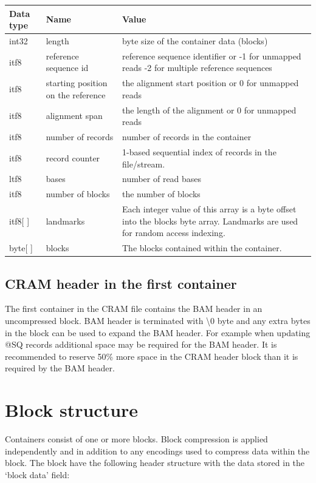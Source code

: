 \documentclass[a4paper]{article}
\begin{document}
\begin{tabular}{|l|>{\raggedright}p{120pt}|>{\raggedright}p{260pt}|}
\hline
\textbf{Data type} & \textbf{Name} & \textbf{Value}
\tabularnewline
\hline
int32 & length & byte size of the container data (blocks)\tabularnewline
\hline
itf8 & reference sequence id & reference sequence identifier  or\linebreak{}
-1 for unmapped reads\linebreak{}
-2 for multiple reference sequences\tabularnewline
\hline
itf8 & starting position on the reference & the alignment start position or\linebreak{}
0 for unmapped reads\tabularnewline
\hline
itf8 & alignment span & the length of the alignment or\linebreak{}
0 for unmapped reads\tabularnewline
\hline
itf8 & number of records & number of records in the container\tabularnewline
\hline
itf8 & record counter & 1-based sequential index of records in the file/stream.\tabularnewline
\hline
ltf8 & bases & number of read bases\tabularnewline
\hline
itf8 & number of blocks & the number of blocks\tabularnewline
\hline
itf8[ ] & landmarks & Each integer value of this array is a byte offset into the 
blocks byte array. Landmarks are used for random access indexing.\tabularnewline
\hline
byte[ ] & blocks & The blocks contained within the container.\tabularnewline
\hline
\end{tabular}

\subsection{\textbf{CRAM header in the first container}}

The first container in the CRAM file contains the BAM header in an uncompressed 
block.  BAM header is terminated with \textbackslash{}0 byte and any extra bytes 
in the block can be used to expand the BAM header. For example when updating @SQ 
records additional space may be required for the BAM header. It is recommended 
to reserve 50\% more space in the CRAM header block than it is required by the 
BAM header.

\section{\textbf{Block structure}}

Containers consist of one or more blocks. Block compression is applied independently 
and in addition to any encodings used to compress data within the block. The block 
have the following header structure with the data stored in the `block data' field:
\end{document}
